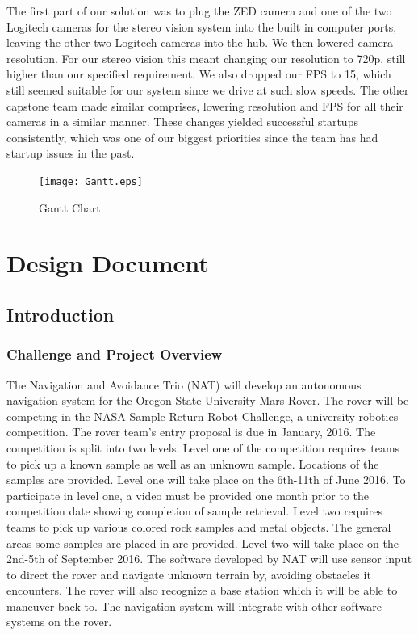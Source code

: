 \documentclass[10pt, oneside,onecolumn]{IEEEtran}
\begin{document}
\begin{titlepage}
The first part of our solution was to plug the ZED camera and one of the two Logitech cameras for the stereo vision system into the built in computer ports, leaving the other two Logitech cameras into the hub. We then lowered camera resolution. For our stereo vision this meant changing our resolution to 720p, still higher than our specified requirement. We also dropped our FPS to 15, which still seemed suitable for our system since we drive at such slow speeds. The other capstone team made similar comprises, lowering resolution and FPS for all their cameras in a similar manner. These changes yielded successful startups consistently, which was one of our biggest priorities since the team has had startup issues in the past. 

\begin{figure}[H]
\centering
\texttt{[image: Gantt.eps]}
\caption{Gantt Chart}
\end{figure}

\section{Design Document}

\subsection{Introduction}

\subsubsection{Challenge and Project Overview}

The Navigation and Avoidance Trio (NAT) will develop an autonomous navigation system for the Oregon State University Mars Rover. The rover will be competing in the NASA Sample Return Robot Challenge, a university robotics competition. The rover team's entry proposal is due in January, 2016. The competition is split into two levels. Level one of the competition requires teams to pick up a known sample as well as an unknown sample. Locations of the samples are provided. Level one will take place on the 6th-11th of June 2016. To participate in level one, a video must be provided one month prior to the competition date showing completion of sample retrieval. Level two requires teams to pick up various colored rock samples and metal objects. The general areas some samples are placed in are provided. Level two will take place on the 2nd-5th of September 2016. The software developed by NAT will use sensor input to direct the rover and navigate unknown terrain by, avoiding obstacles it encounters. The rover will also recognize a base station which it will be able to maneuver back to. The navigation system will integrate with other software systems on the rover.


\end{titlepage}
\end{document}
